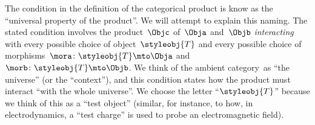 \begin{remark}
  The condition in the definition of the categorical product is know as the ``universal property of the product''.
  We will attempt to explain this naming.
  The stated condition involves the product~$\Objc$ of~$\Obja$ and~$\Objb$ \emph{interacting} with every possible choice of object~$\styleobj{T}$ and every possible choice of morphisms~$\mora \colon \styleobj{T} \mto \Obja$ and~$\morb\colon \styleobj{T} \mto \Objb$.
  We think of the ambient category~\CatC as ``the universe'' (or the ``context''), and this condition states how the product must interact ``with the whole universe''.
  We choose the letter ``$\styleobj{T}$'' because we think of this as a ``test object'' (similar, for instance,  to how, in electrodynamics, a ``test charge'' is used to probe an electromagnetic field).
\end{remark}

